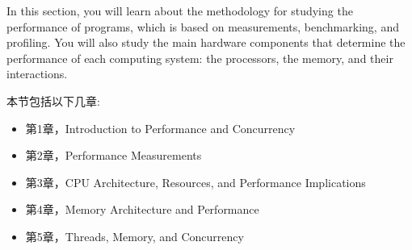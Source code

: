 In this section, you will learn about the methodology for studying the performance of programs, which is based on measurements, benchmarking, and profiling. You will also study the main hardware components that determine the performance of each computing system: the processors, the memory, and their interactions.

本节包括以下几章:

\begin{itemize}
\item 第1章，Introduction to Performance and Concurrency
\item 第2章，Performance Measurements
\item 第3章，CPU Architecture, Resources, and Performance Implications
\item 第4章，Memory Architecture and Performance
\item 第5章，Threads, Memory, and Concurrency
\end{itemize}